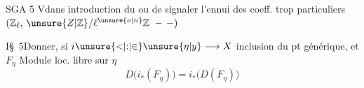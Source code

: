 \noindent SGA 5 \(\mathrm{V}\)\quad dans introduction du  ou de  signaler l'ennui des coeff. trop particuliers \((\mathbb{Z}_{\ell},\,\unsure{Z|\mathbb{Z}}/\ell^{\unsure{\nu|n}}\mathbb{Z}\ -\,-)\)


\noindent \(\mathrm{I}\)\quad \S\ 5\qquad Donner, si \(i\unsure{{<}|{:}|{\in}}\unsure{\eta|y}\longrightarrow X\) inclusion du pt générique, et \(F_{\eta}\) Module loc. libre sur \(\eta\)
\[
 D\bigl(i_{*}(F_{\eta})\bigr)=i_{*}\bigl(D(F_{\eta})\bigr)
\]
\clearpage
